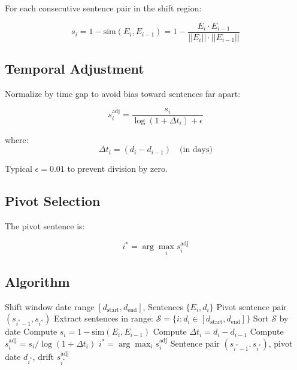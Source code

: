 \documentclass[12pt]{article}
\begin{document}
For each consecutive sentence pair in the shift region:

\begin{equation}
s_i = 1 - \text{sim}(E_i, E_{i-1}) = 1 - \frac{E_i \cdot E_{i-1}}{||E_i|| \cdot ||E_{i-1}||}
\end{equation}

\subsection{Temporal Adjustment}

Normalize by time gap to avoid bias toward sentences far apart:

\begin{equation}
s_i^{\text{adj}} = \frac{s_i}{\log(1 + \Delta t_i) + \epsilon}
\end{equation}

where:
\begin{equation}
\Delta t_i = (d_i - d_{i-1}) \quad \text{(in days)}
\end{equation}

Typical $\epsilon = 0.01$ to prevent division by zero.

\subsection{Pivot Selection}

The pivot sentence is:

\begin{equation}
i^* = \arg\max_{i} s_i^{\text{adj}}
\end{equation}

\subsection{Algorithm}

\begin{algorithm}[H]
\caption{Micro Pivot Detection}
\begin{algorithmic}[1]
\REQUIRE Shift window date range $[d_{\text{start}}, d_{\text{end}}]$, Sentences $\{E_i, d_i\}$
\ENSURE Pivot sentence pair $(s_{i^*-1}, s_{i^*})$
\STATE Extract sentences in range: $\mathcal{S} = \{i : d_i \in [d_{\text{start}}, d_{\text{end}}]\}$
\STATE Sort $\mathcal{S}$ by date
    \STATE Compute $s_i = 1 - \text{sim}(E_i, E_{i-1})$
    \STATE Compute $\Delta t_i = d_i - d_{i-1}$
    \STATE Compute $s_i^{\text{adj}} = s_i / \log(1 + \Delta t_i)$
\ENDFOR
\STATE $i^* = \arg\max_i s_i^{\text{adj}}$
\RETURN Sentence pair $(s_{i^*-1}, s_{i^*})$, pivot date $d_{i^*}$, drift $s_{i^*}^{\text{adj}}$
\end{algorithmic}
\end{algorithm}
\end{document}
